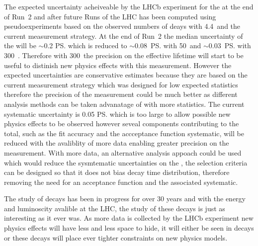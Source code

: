 The expected uncertainty acheiveable by the LHCb experiment for the \el at the end of Run~2 and after future Runs of the LHC has been computed using pseudoexperiments based on the observed numbers of deays with 4.4~\fb and the current measurement strategy. At the end of Run~2 the median uncertainty of the \el will be $\sim$0.2 \ps which is reduced to $\sim$0.08~\ps with 50~\fb and $\sim$0.03~\ps with 300~\fb. Therefore with 300~\fb the precision on the effective lifetime will start to be useful to distinish new physics effects with this measurement. However the expected uncertainties are conservative estimates because they are based on the current measurement strategy which was designed for low expected statistics therefore the precision of the measurement could be much better as different analysis methods can be taken advanatage of with more statistics. 
The current systematic uncertainty is 0.05 \ps which is too large to allow possible new physics effects to be observed however seveal components contributing to the total, such as the fit accuracy and the accceptance function systematic, will be reduced with the avaliblity of more data enabling greater precision on the measurement. With more data, an alternative analysis appoach could be used which would reduce the sysmtematic uncertainties on the \el, the selection criteria can be designed so that it does not bias \bsmumu decay time distribution, therefore removing the need for an acceptance function and the associated systematic.


The study of \bmumu decays has been in progress for over 30 years and with the energy and luminoscity avalible at the LHC, the study of these decays is just as interesting as it ever was. As more data is collected by the LHCb experiment new physics effects will have less and less space to hide, it will either be seen in \bmumu decays or these decays will place ever tighter constraints on new physics models. 
